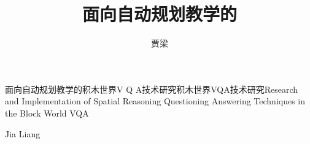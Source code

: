 \title{面向自动规划教学的}{面向自动规划教学的积木世界V Q A技术研究}{积木世界VQA技术研究}{}{Research and Implementation of Spatial Reasoning Questioning Answering Techniques }{in the Block World VQA}
\author{贾梁}{Jia Liang}
\makebigcover
\makecover
